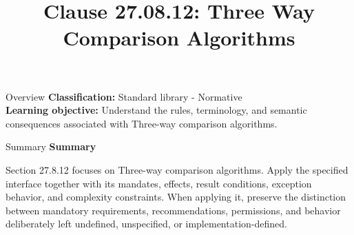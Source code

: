 \documentclass[10pt,letterpaper]{article}
\title{Clause 27.08.12: Three Way Comparison Algorithms}
\author{}
\date{}
\begin{document}
\maketitle
\begin{CornellOverviewBox}{Overview}
\textbf{Classification:} Standard library - Normative\\[2pt]
\textbf{Learning objective:} Understand the rules, terminology, and semantic consequences associated with Three-way comparison algorithms.
\end{CornellOverviewBox}\begin{CornellSummaryBox}{Summary}
{\sffamily\bfseries\color{Accent} Summary}\par\vspace{3pt}Section 27.8.12 focuses on Three-way comparison algorithms. Apply the specified interface together with its mandates, effects, result conditions, exception behavior, and complexity constraints. When applying it, preserve the distinction between mandatory requirements, recommendations, permissions, and behavior deliberately left undefined, unspecified, or implementation-defined.
\end{CornellSummaryBox}
\end{document}
